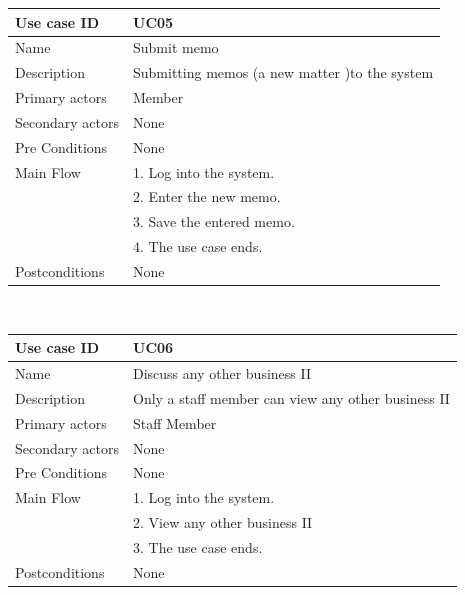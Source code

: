 \documentclass[a4paper,beamer]{article}
\begin{document}
			\begin{tabular}{|p{4cm}|p{8cm}|} \hline 
					\textbf{Use case ID} & \textbf{UC05}  \\ \hline
					Name & Submit memo \\ \hline 
					Description & Submitting  memos (a new matter )to the system \\ \hline 
					Primary actors & Member \\ \hline 
					Secondary actors & None \\ \hline 
					Pre Conditions & None \\ \hline
					Main Flow & 1. Log into the system.\\
										& 2. Enter the new memo. \\
										& 3. Save the entered memo.\\
										& 4. The use case ends.\\ \hline
					Postconditions & None \\ \hline 
			\end{tabular} \\[.6cm]
			
			\begin{tabular}{|p{4cm}|p{8cm}|} \hline 
					\textbf{Use case ID} & \textbf{UC06}  \\ \hline
					Name & Discuss any other business II \\ \hline 
					Description & Only a staff member can view any other business II \\ \hline 
					Primary actors & Staff Member \\ \hline 
					Secondary actors & None \\ \hline 
					Pre Conditions & None \\ \hline
					Main Flow & 1. Log into the system.\\
										& 2. View any other business II \\
										& 3. The use case ends.\\ \hline
					Postconditions & None \\ \hline 
			\end{tabular} \\[.6cm]
			
\end{document}
